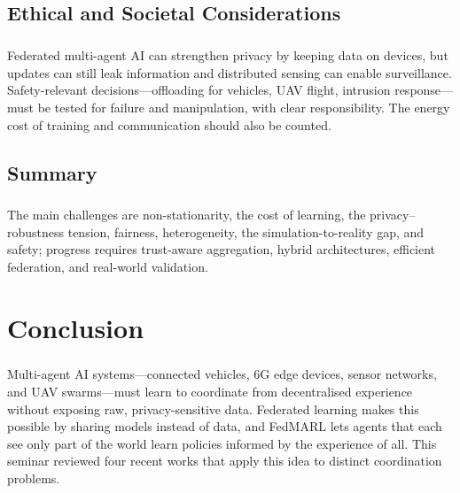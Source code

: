 \documentclass[12pt,a4paper,final]{extreport}
\begin{document}
\section{Ethical and Societal Considerations}

\paragraph{} Federated multi-agent AI can strengthen privacy by keeping data on devices, but updates can still leak information and distributed sensing can enable surveillance. Safety-relevant decisions---offloading for vehicles, UAV flight, intrusion response---must be tested for failure and manipulation, with clear responsibility. The energy cost of training and communication should also be counted.

\section{Summary}

\paragraph{} The main challenges are non-stationarity, the cost of learning, the privacy--robustness tension, fairness, heterogeneity, the simulation-to-reality gap, and safety; progress requires trust-aware aggregation, hybrid architectures, efficient federation, and real-world validation.

\chapter{Conclusion}

\paragraph{} Multi-agent AI systems---connected vehicles, 6G edge devices, sensor networks, and UAV swarms---must learn to coordinate from decentralised experience without exposing raw, privacy-sensitive data. Federated learning makes this possible by sharing models instead of data, and FedMARL lets agents that each see only part of the world learn policies informed by the experience of all. This seminar reviewed four recent works that apply this idea to distinct coordination problems.
\end{document}
